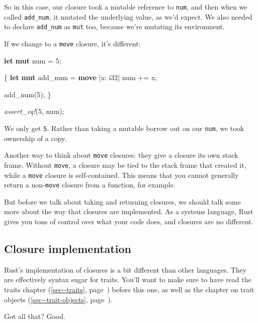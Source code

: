 \documentclass[a4paper,]{book}
\renewcommand*{\hyperref}[2][\ar]{%
  \def\ar{#2}%
  #2 (\autoref{#1}, page~\pageref{#1})}
\newenvironment{Shaded}{\begin{snugshade}}{\end{snugshade}}
\newcommand{\KeywordTok}[1]{\textcolor[rgb]{0.13,0.29,0.53}{\textbf{{#1}}}}
\newcommand{\DataTypeTok}[1]{\textcolor[rgb]{0.13,0.29,0.53}{{#1}}}
\newcommand{\DecValTok}[1]{\textcolor[rgb]{0.00,0.00,0.81}{{#1}}}
\newcommand{\PreprocessorTok}[1]{\textcolor[rgb]{0.56,0.35,0.01}{\textit{{#1}}}}
\newcommand{\NormalTok}[1]{{#1}}
\begin{document}
So in this case, our closure took a mutable reference to \texttt{num},
and then when we called \texttt{add\_num}, it mutated the underlying
value, as we'd expect. We also needed to declare \texttt{add\_num} as
\texttt{mut} too, because we're mutating its environment.

If we change to a \texttt{move} closure, it's different:

\begin{Shaded}
\begin{Highlighting}[]
\KeywordTok{let} \KeywordTok{mut} \NormalTok{num = }\DecValTok{5}\NormalTok{;}

\NormalTok{\{}
    \KeywordTok{let} \KeywordTok{mut} \NormalTok{add_num = }\KeywordTok{move} \NormalTok{|x: }\DataTypeTok{i32}\NormalTok{| num += x;}

    \NormalTok{add_num(}\DecValTok{5}\NormalTok{);}
\NormalTok{\}}

\PreprocessorTok{assert_eq!}\NormalTok{(}\DecValTok{5}\NormalTok{, num);}
\end{Highlighting}
\end{Shaded}

We only get \texttt{5}. Rather than taking a mutable borrow out on our
\texttt{num}, we took ownership of a copy.

Another way to think about \texttt{move} closures: they give a closure
its own stack frame. Without \texttt{move}, a closure may be tied to the
stack frame that created it, while a \texttt{move} closure is
self-contained. This means that you cannot generally return a
non-\texttt{move} closure from a function, for example.

But before we talk about taking and returning closures, we should talk
some more about the way that closures are implemented. As a systems
language, Rust gives you tons of control over what your code does, and
closures are no different.

\subsection{Closure implementation}\label{closure-implementation}

Rust's implementation of closures is a bit different than other
languages. They are effectively syntax sugar for traits. You'll want to
make sure to have read the \hyperref[sec--traits]{traits chapter} before
this one, as well as the chapter on \hyperref[sec--trait-objects]{trait
objects}.

Got all that? Good.
\end{document}
